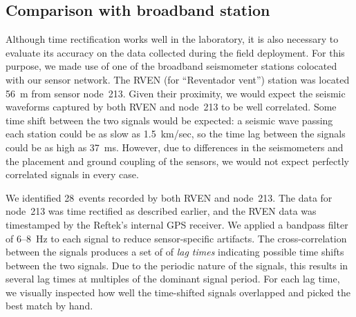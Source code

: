 

\subsection{Comparison with broadband station}
\label{sec-datagroundtruthing}

Although time rectification works well in the laboratory, it is also
necessary to evaluate its accuracy on the data collected during the field
deployment. For this purpose, we made use of one of the broadband seismometer
stations colocated with our sensor network. The RVEN (for ``Reventador
vent'') station was located 56~m from sensor node~213.  
Given their proximity, we would expect
the seismic waveforms captured by both RVEN and node~213 to be
well correlated.  Some time shift between the two signals would be expected:
a seismic wave passing each station could be as slow as 1.5~km/sec, so
the time lag between the signals could be as high as 37~ms.  However, due to
differences in the seismometers and the placement and ground coupling of the
sensors, we would not expect perfectly correlated signals in every
case.


We identified 28~events recorded by both RVEN and node~213.  The data for
node~213 was time rectified as described earlier, and the RVEN data was
timestamped by the Reftek's internal GPS receiver.  We applied a bandpass
filter of 6--8~Hz to each signal to reduce sensor-specific artifacts. The
cross-correlation between the signals produces a set of
of {\em lag times} indicating possible time shifts between the two signals.
Due to the periodic nature of the signals, this results in
several lag times at multiples of the dominant signal period. For each lag
time, we visually inspected how well the time-shifted signals overlapped and
picked the best match by hand.


